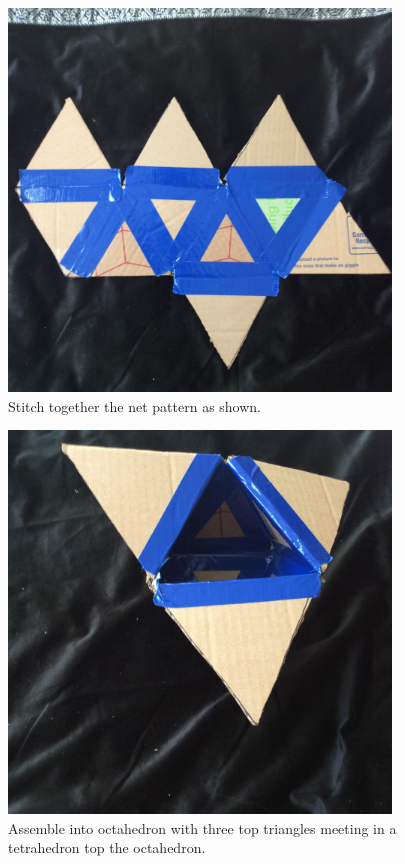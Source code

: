 \begin{figure}
	\centering
	\includegraphics[width=4in]{figures/trashrobot/artboxnet.jpg}
	\caption[artboxtnet]
	{Stitch together the net pattern as shown.}
\end{figure}


\begin{figure}
	\centering
	\includegraphics[width=4in]{figures/trashrobot/artboxassembly.jpg}
	\caption[artboxassembly]
	{Assemble into octahedron with three top triangles meeting in a tetrahedron top the octahedron.}
\end{figure}

